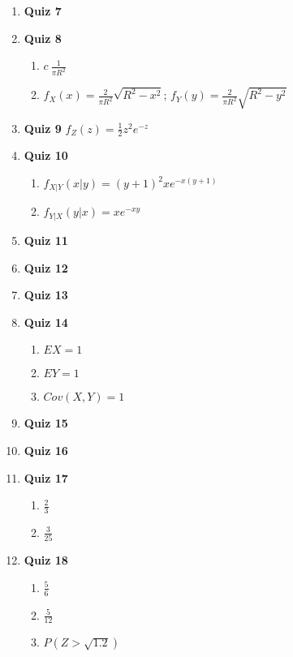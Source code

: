 \documentclass{article}
\begin{document}
\begin{enumerate}
\item \textbf{\large Quiz 7}


\item \textbf{\large Quiz 8}
\begin{enumerate}
    \item $c \ \frac{1}{\pi R^2}$
    \item $f_X(x) = \frac{2}{\pi R^2}\sqrt{R^2 - x^2}$;  $f_Y(y) = \frac{2}{\pi R^2}\sqrt{R^2 - y^2}$
\end{enumerate}

\item \textbf{\large Quiz 9}
     $f_Z(z) = \frac{1}{2}z^2e^{-z}$



\item \textbf{\large Quiz 10}
\begin{enumerate}
    \item $f_{X|Y}(x|y) = (y+1)^2 xe^{-x(y+1)}$
    \item $f_{Y|X}(y|x) = xe^{-xy}$
\end{enumerate}

\item \textbf{\large Quiz 11}

\item \textbf{\large Quiz 12}

\item \textbf{\large Quiz 13}

\item \textbf{\large Quiz 14}
\begin{enumerate}
    \item $EX = 1$
    \item $EY = 1$
    \item $Cov(X,Y) = 1$
\end{enumerate}

\item \textbf{\large Quiz 15}

\item \textbf{\large Quiz 16}

\item \textbf{\large Quiz 17}
\begin{enumerate}
    \item $\frac{2}{3}$
    \item $\frac{3}{25}$
\end{enumerate}

\item \textbf{\large Quiz 18}
\begin{enumerate}
    \item $\frac{5}{6}$
    \item $\frac{5}{12}$
    \item $P(Z > \sqrt{1.2})$
\end{enumerate}



\end{enumerate}
\end{document}
